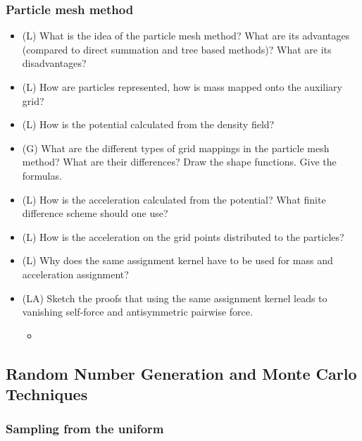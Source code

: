 \subsubsection*{Particle mesh method}
\begin{itemize}
    \item (L) What is the idea of the particle mesh method? What are its advantages (compared to direct summation
    and tree based methods)? What are its disadvantages?
    \answerboxM
    \item (L) How are particles represented, how is mass mapped onto the auxiliary grid?
    \answerboxM
    \item (L) How is the potential calculated from the density field?
    \answerboxM
    \item (G) What are the different types of grid mappings in the particle mesh method? What are their
    differences? Draw the shape functions. Give the formulas.
    \answerboxL
    \item (L) How is the acceleration calculated from the potential? What finite difference scheme should one use?
    \answerboxM
    \item (L) How is the acceleration on the grid points distributed to the particles?
    \answerboxM
    \item (L) Why does the same assignment kernel have to be used for mass and acceleration assignment?
    \answerboxM
    \item (LA) Sketch the proofs that using the same assignment kernel leads to vanishing self-force and
    antisymmetric pairwise force.
    \begin{itemize}
        \item {}
    \end{itemize}
    \answerboxL
\end{itemize}

\subsection*{Random Number Generation and Monte Carlo Techniques}

\subsubsection*{Sampling from the uniform}

